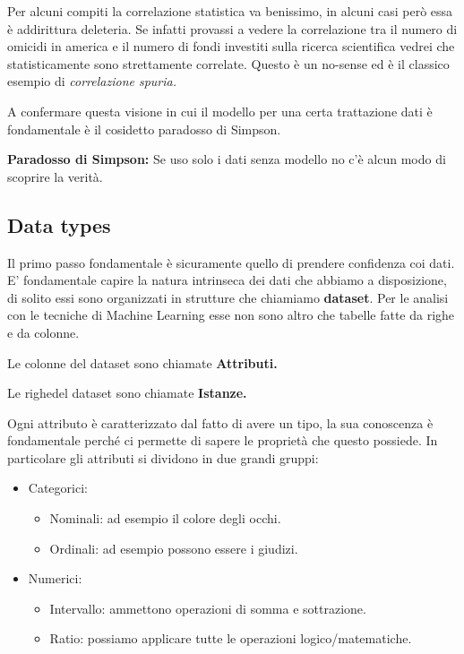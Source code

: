 Per alcuni compiti la correlazione statistica va benissimo, in alcuni casi però essa è addirittura deleteria.  Se infatti provassi a vedere la correlazione tra il numero di omicidi in america e il numero di fondi investiti sulla ricerca scientifica vedrei che statisticamente sono strettamente correlate. Questo è un no-sense ed è il classico esempio di \textit{correlazione spuria.}

A confermare questa visione in cui il modello per una certa trattazione dati è fondamentale è il cosidetto paradosso di Simpson.

\textbf{Paradosso di Simpson:} Se uso solo i dati senza modello no c'è alcun modo di scoprire la verità.


\subsection{Data types}

Il primo passo fondamentale è sicuramente quello di prendere confidenza coi dati. E' fondamentale capire la natura intrinseca dei dati che abbiamo a disposizione, di solito essi sono organizzati in strutture che chiamiamo \textbf{dataset}. Per le analisi con le tecniche di Machine Learning esse non sono altro che tabelle fatte da righe e da colonne.

Le colonne del dataset sono chiamate \textbf{Attributi.}

Le righedel dataset sono chiamate \textbf{Istanze.}

Ogni attributo è caratterizzato dal fatto di avere un tipo, la sua conoscenza è fondamentale perché ci permette di sapere le proprietà che questo possiede.
In particolare gli attributi si dividono in due grandi gruppi:
\begin{itemize}
	\item Categorici:
	\begin{itemize}
		\item Nominali: ad esempio il colore degli occhi.
		\item Ordinali: ad esempio possono essere i giudizi.
	\end{itemize}
	\item Numerici:
	\begin{itemize}
		\item Intervallo: ammettono operazioni di somma e sottrazione. 
		\item Ratio: possiamo applicare tutte le operazioni logico/matematiche.
	\end{itemize}
\end{itemize}


